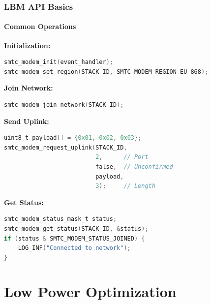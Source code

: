 \documentclass{beamer}
\begin{document}
\begin{frame}[fragile]
\frametitle{LBM API Basics}
\framesubtitle{Common Operations}

\textbf{Initialization:}
\begin{lstlisting}[language=C, basicstyle=\tiny\ttfamily]
smtc_modem_init(event_handler);
smtc_modem_set_region(STACK_ID, SMTC_MODEM_REGION_EU_868);
\end{lstlisting}

\textbf{Join Network:}
\begin{lstlisting}[language=C, basicstyle=\tiny\ttfamily]
smtc_modem_join_network(STACK_ID);
\end{lstlisting}

\textbf{Send Uplink:}
\begin{lstlisting}[language=C, basicstyle=\tiny\ttfamily]
uint8_t payload[] = {0x01, 0x02, 0x03};
smtc_modem_request_uplink(STACK_ID,
                          2,      // Port
                          false,  // Unconfirmed
                          payload,
                          3);     // Length
\end{lstlisting}

\textbf{Get Status:}
\begin{lstlisting}[language=C, basicstyle=\tiny\ttfamily]
smtc_modem_status_mask_t status;
smtc_modem_get_status(STACK_ID, &status);
if (status & SMTC_MODEM_STATUS_JOINED) {
    LOG_INF("Connected to network");
}
\end{lstlisting}
\end{frame}

\section{Low Power Optimization}
\end{document}
